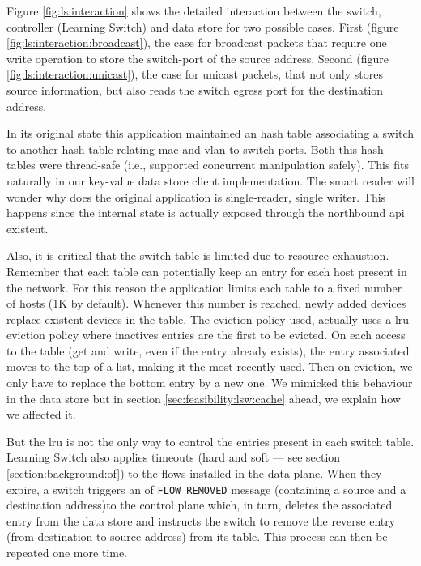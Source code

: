Figure \ref{fig:ls:interaction}  shows the detailed interaction between the
switch, controller (Learning Switch) and data store for two possible
cases. First (figure \ref{fig:ls:interaction:broadcast}), the case for broadcast packets that require
one write operation to store the switch-port  of the
source address. Second (figure \ref{fig:ls:interaction:unicast}),   the case for unicast
packets, that not only stores source information, but also reads the
switch egress port for the destination address.  

In its original state this application maintained an hash table
associating a switch to another hash table relating  \gls{mac} and
\gls{vlan} to switch ports. Both this hash tables were thread-safe
(i.e., supported concurrent manipulation safely). This fits naturally
in our key-value data store client implementation. The smart reader 
will wonder why does the original application is single-reader, single
writer. This happens since the internal state is actually exposed
through the northbound \gls{api} existent.  

Also, it is critical that the switch table is limited due to resource
exhaustion. Remember that each table can potentially keep an entry for
each host present in the network. For this reason the application
limits each table to a fixed number of hosts (1K by default). Whenever
this number is reached, newly added devices replace existent
devices in the table. The eviction policy used, actually uses a
\gls{lru} eviction policy where inactives entries are the first to be
evicted. On each access to the table (get and write, even if the entry
already exists), the entry associated moves to the top of a list,
making it the most recently used. Then on eviction, we only have to replace the
bottom entry by a new one. We mimicked this behaviour in the data
store but in section \ref{sec:feasibility:lsw:cache} ahead, we explain
how we affected it. 

But the \gls{lru} is not the only way to control the entries present
in each switch table. Learning Switch also applies timeouts (hard and
soft --- see section \ref{section:background:of})  to the flows
installed in the data plane. When they expire, a switch triggers an
\gls{of} \texttt{FLOW\_REMOVED} message (containing a source and a
destination address)to the control plane which, in
turn, deletes the associated entry from the data store and instructs
the switch to remove the reverse entry (from destination to source
address) from its table. This process can then be repeated one more
time. 

